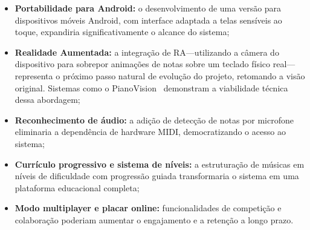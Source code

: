 \documentclass[
  12pt,
  openright,
  twoside,
  a4paper,
  english,
  brazil
]{abntex2}
\begin{document}
\begin{itemize}
  \item \textbf{Portabilidade para Android:} o desenvolvimento de uma
        versão para dispositivos móveis Android, com interface adaptada
        a telas sensíveis ao toque, expandiria significativamente o
        alcance do sistema;

  \item \textbf{Realidade Aumentada:} a integração de RA---utilizando
        a câmera do dispositivo para sobrepor animações de notas sobre
        um teclado físico real---representa o próximo passo natural de
        evolução do projeto, retomando a visão original. Sistemas como
        o PianoVision\textregistered~\cite{pianovision} demonstram a
        viabilidade técnica dessa abordagem;

  \item \textbf{Reconhecimento de áudio:} a adição de detecção de
        notas por microfone eliminaria a dependência de hardware MIDI,
        democratizando o acesso ao sistema;

  \item \textbf{Currículo progressivo e sistema de níveis:} a
        estruturação de músicas em níveis de dificuldade com progressão
        guiada transformaria o sistema em uma plataforma educacional
        completa;

  \item \textbf{Modo multiplayer e placar online:} funcionalidades de
        competição e colaboração poderiam aumentar o engajamento e a
        retenção a longo prazo.
\end{itemize}

\postextual

\printbibliography[title=Referências]
\end{document}
